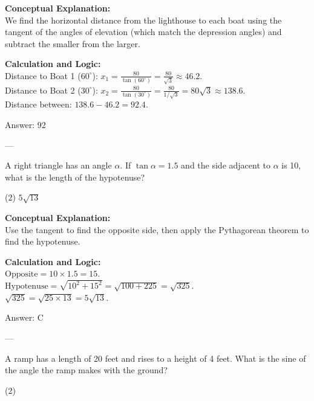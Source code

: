 \documentclass[11pt,paper=a4,answers]{exam}
\begin{document}
\begin{questions}
\begin{solution}
\textbf{Conceptual Explanation:} \\
We find the horizontal distance from the lighthouse to each boat using the tangent of the angles of elevation (which match the depression angles) and subtract the smaller from the larger.

\vspace{10pt}
\textbf{Calculation and Logic:} \\
Distance to Boat 1 ($60^\circ$): $x_1 = \frac{80}{\tan(60^\circ)} = \frac{80}{\sqrt{3}} \approx 46.2$. \\
Distance to Boat 2 ($30^\circ$): $x_2 = \frac{80}{\tan(30^\circ)} = \frac{80}{1/\sqrt{3}} = 80\sqrt{3} \approx 138.6$. \\
Distance between: $138.6 - 46.2 = 92.4$.

\vspace{15pt}
Answer: \colorbox{yellow!100}{92}
\end{solution}

---

\question
A right triangle has an angle $\alpha$. If $\tan \alpha = 1.5$ and the side adjacent to $\alpha$ is 10, what is the length of the hypotenuse?
\begin{tasks}(2)
    \task $5\sqrt{13}$
\end{tasks}

\begin{solution}
\textbf{Conceptual Explanation:} \\
Use the tangent to find the opposite side, then apply the Pythagorean theorem to find the hypotenuse.

\vspace{10pt}
\textbf{Calculation and Logic:} \\
$\text{Opposite} = 10 \times 1.5 = 15$. \\
$\text{Hypotenuse} = \sqrt{10^2 + 15^2} = \sqrt{100 + 225} = \sqrt{325}$. \\
$\sqrt{325} = \sqrt{25 \times 13} = 5\sqrt{13}$.

\vspace{15pt}
Answer: \colorbox{yellow!100}{C}
\end{solution}

---

\question
A ramp has a length of 20 feet and rises to a height of 4 feet. What is the sine of the angle the ramp makes with the ground?
\begin{tasks}(2)
\end{tasks}


\end{questions}
\end{document}
